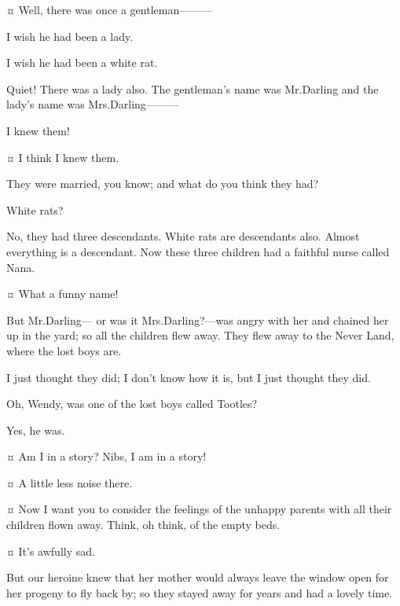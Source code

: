 \begin{drama}
\wendyspeaks {}¤
Well, there was once a gentleman———

\curlyspeaks
I wish he had been a lady.

\nibsspeaks
I wish he had been a white rat.

\wendyspeaks
Quiet!
There was a lady also.
The gentleman’s name was Mr.\@ Darling and the lady’s name was Mrs.\@ Darling———

\johnspeaks
I knew them!

\michaelspeaks {}¤
I think I knew them.

\wendyspeaks
They were married, you know; and what do you think they had?

\nibsspeaks
White rats?

\wendyspeaks
No, they had three descendants.
White rats are descendants also.
Almost everything is a descendant.
Now these three children had a faithful nurse called Nana.

\michaelspeaks {}¤
What a funny name!

\wendyspeaks
But Mr.\@ Darling— or was it Mrs.\@ Darling?—was angry with her
and chained her up in the yard;
so all the children flew away.
They flew away to the Never Land, where the lost boys are.

\curlyspeaks
I just thought they did;
I don’t know how it is, but I just thought they did.

\tootlesspeaks
Oh, Wendy, was one of the lost boys called Tootles?

\wendyspeaks
Yes, he was.

\tootlesspeaks {}¤
Am I in a story?
Nibs, I am in a story!

\peterspeaks {}¤
A little less noise there.

\wendyspeaks {}¤
Now I want you to consider the feelings of the unhappy parents with all their children flown away.
Think, oh think, of the empty beds.

\firsttwinspeaks {}¤
It’s awfully sad.

\wendyspeaks
But our heroine knew that her mother would always leave the window open for her progeny to fly back by;
so they stayed away for years and had a lovely time.


\end{drama}
